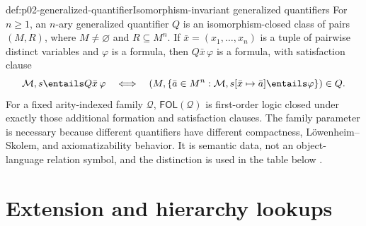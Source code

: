 \begin{hbdefinition}{def:p02-generalized-quantifier}{Isomorphism-invariant generalized quantifiers}
For \(n\geq1\), an \(n\)-ary generalized quantifier \(Q\) is an
isomorphism-closed class of pairs \((M,R)\), where \(M\ne\varnothing\) and
\(R\subseteq M^n\).  If \(\bar x=(x_1,\ldots,x_n)\) is a tuple of pairwise
distinct variables and \(\varphi\) is a
formula, then \(Q\bar x\,\varphi\) is a formula, with satisfaction clause
\[
 \mathcal M,s\entails Q\bar x\,\varphi
 \quad\Longleftrightarrow\quad
 \left(M,
   \{\bar a\in M^n:\mathcal M,s[\bar x\mapsto\bar a]\entails\varphi\}
 \right)\in Q.
\]
For a fixed arity-indexed family \(\mathcal Q\),
\(\mathsf{FOL}(\mathcal Q)\) is first-order logic closed under exactly those
additional formation and satisfaction clauses.  The family parameter is
necessary because different quantifiers have different compactness,
L\"owenheim--Skolem, and axiomatizability behavior.  It is semantic data, not
an object-language relation symbol, and the distinction is used in the table
below \cite{Mostowski1957,Lindstrom1966,Keisler1970}.
\end{hbdefinition}

\section{Extension and hierarchy lookups}
\label{sec:p02-extension-lookup}

